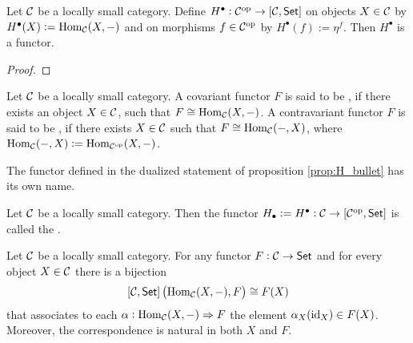 \begin{proposition}
	Let $\mathcal{C}$ be a locally small category. Define $H^\bullet : \Ccal^\oprm \to \sbr{\Ccal,\cat{Set}}$ on objects $X \in \mathcal{C}$ by $H^\bullet(X) := \operatorname{Hom}_{\mathcal{C}}(X,-)$ and on morphisms $f \in \mathcal{C}^{\mathrm{op}}$ by $H^\bullet(f) := \eta^f$. Then $H^\bullet$ is a functor.
	\label{prop:H_bullet}
\end{proposition}

\begin{proof}
	
\end{proof}

\begin{definition}
	Let $\mathcal{C}$ be a locally small category. A covariant functor $F$ is said to be , if there exists an object $X \in \mathcal{C}$, such that $F \cong \operatorname{Hom}_{\mathcal{C}}(X,-)$. A contravariant functor $F$ is said to be , if there exists $X \in \mathcal{C}$ such that $F \cong \operatorname{Hom}_{\mathcal{C}}(-,X)$, where $\operatorname{Hom}_{\mathcal{C}}(-,X) := \operatorname{Hom}_{\mathcal{C}^{\mathrm{op}}}(X,-)$. 
\end{definition}

The functor defined in the dualized statement of proposition \ref{prop:H_bullet} has its own name.

\begin{definition}
	Let $\mathcal{C}$ be a locally small category. Then the functor $H_\bullet := H^\bullet : \Ccal \to \sbr{\Ccal^\oprm,\cat{Set}}$ is called the .  
\end{definition}

\begin{theorem}
	Let $\mathcal{C}$ be a locally small category. For any functor $F : \mathcal{C} \to \mathsf{Set}$ and for every object $X \in \mathcal{C}$ there is a bijection
	\begin{equation}
		\sbr{\Ccal,\cat{Set}}\del[1]{\Hom_\Ccal(X,-),F} \cong F(X)	
	\end{equation}
	\noindent that associates to each $\alpha : \operatorname{Hom}_{\mathcal{C}}(X,-) \Rightarrow F$ the element $\alpha_X(\operatorname{id}_X) \in F(X)$. Moreover, the correspondence is natural in both $X$ and $F$.
	\label{thm:Yoneda}
\end{theorem}





